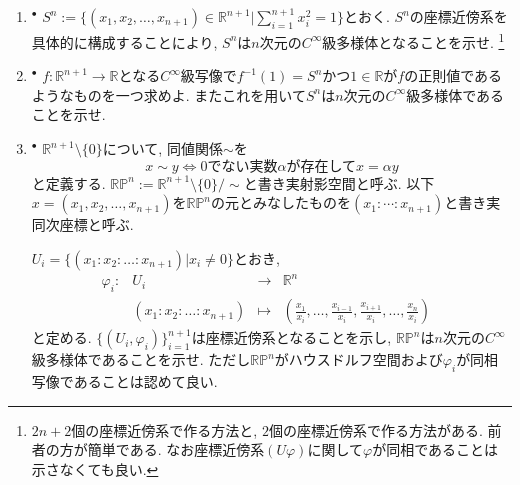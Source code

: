 \documentclass[dvipdfmx,a4paper,11pt]{article}
\newcommand{\R}{\mathbb{R}}
\theoremstyle{definition}
\begin{document}
\begin{enumerate}[label=\textbf{問}\ref*{sec-manifold}.\arabic*]

\item $^\bullet$ \label{sphere} $S^{n} := \{ (x_1, x_2, \ldots, x_{n+1}) \in \R^{n+1}| \sum_{i=1}^{n+1} x_{i}^{2} = 1 \}$とおく. 
$S^n$の座標近傍系を具体的に構成することにより, $S^{n}$は$n$次元の$C^{\infty}$級多様体となることを示せ. \footnote{$2n + 2$個の座標近傍系で作る方法と, $2$個の座標近傍系で作る方法がある. 前者の方が簡単である. なお座標近傍系$(U \varphi)$に関して$\varphi$が同相であることは示さなくても良い.}
	
\item $^\bullet$ $f : \R^{n+1} \rightarrow \R$となる$C^{\infty}$級写像で$f^{-1}(1) = S^{n}$かつ$1 \in \R$が$f$の正則値であるようなものを一つ求めよ. またこれを用いて$S^{n}$は$n$次元の$C^{\infty}$級多様体であることを示せ. 

\item  \label{real_plane} $^\bullet$ $\R^{n+1} \setminus \{ 0\}$について, 同値関係$\sim$を
	$$
	x \sim y \Leftrightarrow \text{0でない実数$\alpha$が存在して$x = \alpha y$}
	$$
	と定義する.
	$ \R\mathbb{P}^{n}:= \R^{n+1} \setminus \{ 0\}/\sim$と書き実射影空間と呼ぶ. %
	以下$x= (x_{1}, x_{2}, \ldots, x_{n+1})$を$\R\mathbb{P}^{n}$の元とみなしたものを$(x_{1}: \cdots : x_{n+1})$と書き実同次座標と呼ぶ. 

 $U_{i} = \{ (x_{1}:x_{2}: \ldots : x_{n+1}) | x_{i}\neq 0\}$とおき, 
$$
\begin{array}{ccccc}
\varphi_{i}: &U_{i}& \rightarrow & \R^{n} & \\
&(x_{1}:x_{2}: \ldots : x_{n+1})& \longmapsto &(\frac{x_1}{x_i}, \ldots, \frac{x_{i-1}}{x_i}, \frac{x_{i+1}}{x_i}, \ldots, \frac{x_n}{x_i})&
\end{array}
$$	
と定める. $\{ (U_i , \varphi_{i})\}_{i=1}^{n+1}$は座標近傍系となることを示し, $\R \mathbb{P}^{n}$は$n$次元の$C^{\infty}$級多様体であることを示せ. ただし$\R \mathbb{P}^{n}$がハウスドルフ空間および$\varphi_i$が同相写像であることは認めて良い. 



\end{enumerate}
\end{document}
